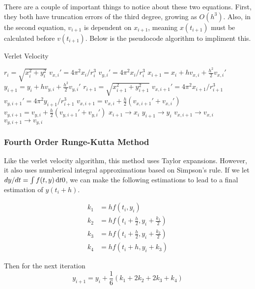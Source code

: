 \documentclass[11pt]{article}
\begin{document}
    There are a couple of important things to notice about these two equations. First, they both have truncation errors of the third degree, growing as $O(h^3)$. Also, in the second equation, $v_{i+1}$ is dependent on $x_{i+1}$, meaning $x(t_{i+1})$ must be calculated before $v(t_{i+1})$. Below is the pseudocode algorithm to impliment this.

    \begin{algorithm}[H]
    \caption{Verlet Velocity}
    \label{Verlet Velocity}
    \begin{algorithmic}[1]
    \State $r_i = \sqrt{x_i^2+y_i^2}$
    \State $v_{x,i}' = 4\pi^2x_i/r_i^3$
    \State $v_{y,i}' = 4\pi^2x_i/r_i^3$
    \State $x_{i+1} = x_i + hv_{x,i}+ \frac{h^2}{2}v_{x,i}'$
    \State $y_{i+1} = y_i + hv_{y,i}+ \frac{h^2}{2}v_{y,i}'$
    \State $r_{i+1} = \sqrt{x_{i+1}^2+y_{i+1}^2}$
    \State $v_{x,i+1}' = 4\pi^2 x_{i+1}/r_{i+1}^3$
    \State $v_{y,i+1}' = 4\pi^2 y_{i+1}/r_{i+1}^3$
    \State $v_{x,i+1} = v_{x,i} + \frac{h}{2}(v_{x,i+1}'+v_{x,i}')$
    \State $v_{y,i+1} = v_{y,i} + \frac{h}{2}(v_{y,i+1}'+v_{y,i}')$
    \State $x_{i+1} \to x_i$
    \State $y_{i+1} \to y_i$
    \State $v_{x,i+1} \to v_{x,i}$
    \State $v_{y,i+1} \to v_{y,i}$
    \EndFor
    \EndFunction
    \end{algorithmic}
    \end{algorithm}

\subsubsection{Fourth Order Runge-Kutta Method}
    
    Like the verlet velocity algorithm, this method uses Taylor expansions. However, it also uses numberical integral approximations based on Simpson's rule. If we let $dy/dt = \int f(t,y) \dif{t}0$, we can make the following estimations to lead to a final estimation of $y(t_i+h)$.

    \begin{align}
    k_1 &= hf(t_i,y_i) \\
    k_2 &= hf(t_i + \frac{h}{2}, y_i+\frac{k_1}{2}) \\
    k_3 &= hf(t_i + \frac{h}{2}, y_i+\frac{k_2}{2}) \\
    k_4 &= hf(t_i + h, y_i+ k_3) 
    \end{align}

    Then for the next iteration
    \begin{equation} y_{i+1} = y_i + \frac{1}{6}(k_1 + 2k_2 + 2k_3 + k_4) \end{equation}
\end{document}
